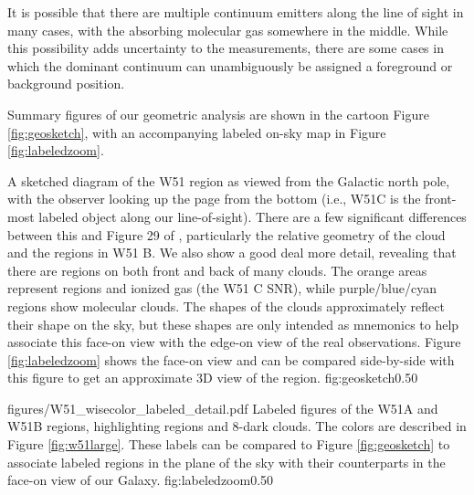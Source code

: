 It is possible that there are multiple continuum emitters along the line of
sight in many cases, with the absorbing molecular gas somewhere in the middle.
While this possibility adds uncertainty to the measurements, there are some
cases in which the dominant continuum can unambiguously be assigned a
foreground or background position.

Summary figures of our geometric analysis are shown in the cartoon Figure
\ref{fig:geosketch}, with an accompanying labeled on-sky map in Figure
\ref{fig:labeledzoom}.

{A sketched diagram of the W51 region as viewed from the Galactic north pole,
with the observer looking up the page from the bottom (i.e., W51C is the 
front-most labeled object along our line-of-sight).  There are a few
significant differences between this and Figure 29 of \citet{Kang2010a},
particularly the relative geometry of the cloud and the \hii regions in W51 B.
We also show a good deal more detail, revealing that there are \hii regions on
both front and back of many clouds.
The orange areas represent \hii regions and ionized gas (the W51 C SNR), while
purple/blue/cyan regions show molecular clouds.
The shapes of the clouds approximately reflect their shape on the sky, but these
shapes are only intended as mnemonics to help associate this face-on view with
the edge-on view of the real observations.
Figure \ref{fig:labeledzoom} shows the face-on view and can be compared
side-by-side with this figure to get an approximate 3D view of the region.
}
{fig:geosketch}{0.5}{0}

\Figure
{figures/W51_wisecolor_labeled_detail.pdf}
{Labeled figures of the W51A and W51B regions, highlighting \hii regions and
8\um-dark clouds.   The colors are described in Figure \ref{fig:w51large}.
These labels can be compared to Figure \ref{fig:geosketch} to associate labeled
regions in the plane of the sky with their counterparts in the face-on view of
our Galaxy.}
{fig:labeledzoom}{0.5}{0}









